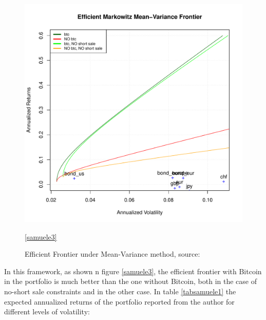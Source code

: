 \begin{figure}[H]
		\centering
		\includegraphics[width=13cm]{Images/images_samuele/efficient_frontier.pdf} %
        \caption{Efficient Frontier under Mean-Variance method, source: \citep{samuele}}
        \ref{samuele3}
\end{figure}

In this framework, as shown n figure \ref{samuele3}, the efficient frontier with Bitcoin in the portfolio is much better than the one without Bitcoin, both in the case of no-short sale constraints and in the other case.
\newpage
In table \ref{tabsamuele1} the expected annualized returns of the portfolio reported from the author for different levels of volatility:

